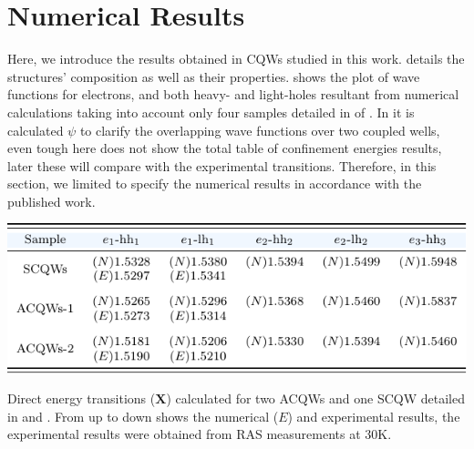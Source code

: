 \section{Numerical Results}
\label{sec:chapter-2-numerical-results}
\vspace{-10mm} 
Here, we introduce the results obtained in \gls{CQWs} studied in this work.  
details the structures' composition as well as their properties. 
 shows the plot of wave functions for electrons, and both heavy- and light-holes resultant from numerical calculations taking into account only four samples detailed in  of .
In  it is calculated $\psi$ to clarify the overlapping wave functions over two coupled wells, even tough here does not show the total table of confinement energies results, later these will  compare with the experimental transitions.  Therefore, in this section, we limited to specify the numerical results  in accordance with the published work\cite{ruiz2021optical}. 
\begin{table}[ht!]
	\centering
	\includegraphics[width=\textwidth]{../tables/chapter-2/numerical-results/build-ruco/numerical-results.pdf}
	\caption{Direct energy transitions ($\mathbf{X}$) calculated for two ACQWs and one SCQW detailed in  and . From up to down shows the numerical ($E$) and experimental results, the experimental results were obtained from RAS measurements at 30K. }
	\label{tab:sec-chapter-2-numerical-results} 
\end{table}
